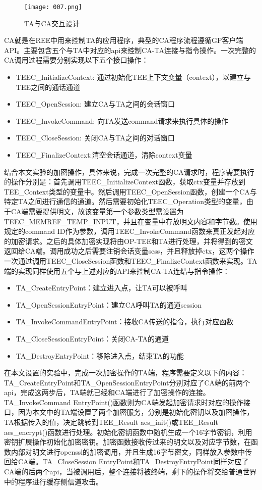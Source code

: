 \begin{figure}[H]
	\centering
	\texttt{[image: 007.png]}
	\caption{TA与CA交互设计}
	\label{007}
\end{figure}

CA就是在REE中用来控制TA的应用程序，典型的CA程序流程遵循GP客户端API。主要包含五个与TA中对应的api来控制CA-TA连接与指令操作。一次完整的CA调用过程需要分别实现以下五个接口操作：

\begin{itemize}
	\item TEEC\_InitializeContext: 通过初始化TEE上下文变量（context），以建立与TEE之间的通话通道
	\item TEEC\_OpenSession: 建立CA与TA之间的会话窗口
	\item TEEC\_InvokeCommand: 向TA发送command请求来执行具体的操作
	\item TEEC\_CloseSession: 关闭CA与TA之间的对话窗口
	\item TEEC\_FinalizeContext:清空会话通道，清除context变量
\end{itemize}

结合本文实验的加密操作，具体来说，完成一次完整的CA请求时，程序需要执行的操作分别是：首先调用TEEC\_InitializeContext函数，获取ctx变量并存放到TEE\_Context类型的变量中。然后调用TEEC\_OpenSession函数，创建一个CA与特定TA之间进行通信的通道。然后需要初始化TEEC\_Operation类型的变量，由于CA端需要提供明文，故该变量第一个参数类型需设置为TEEC\_MEMREF\_TEMP\_INPUT，并且在变量中存放明文内容和字节数。使用规定的command ID作为参数，调用TEEC\_InvokeCommand函数来真正发起对应的加密请求。之后的具体加密实现将由OP-TEE和TA进行处理，并将得到的密文返回给CA端。调用成功之后需要注销会话变量sess，并且释放掉ctx，这两个操作一次通过调用TEEC\_CloseSession函数和TEEC\_FinalizeContext函数来实现。TA端的实现同样使用五个与上述对应的API来控制CA-TA连结与指令操作：

\begin{itemize}
	\item TA\_CreateEntryPoint：建立进入点，让TA可以被呼叫
	\item TA\_OpenSessionEntryPoint：建立CA呼叫TA的通道session
	\item TA\_InvokeCommandEntryPoint：接收CA传送的指令，执行对应函数
	\item TA\_CloseSessionEntryPoint：关闭CA-TA的通道
	\item TA\_DestroyEntryPoint：移除进入点，结束TA的功能
\end{itemize}

在本文设置的实验中，完成一次加密操作的TA端，程序需要定义以下的内容：TA\_CreateEntryPoint和TA\_OpenSessionEntryPoint分别对应了CA端的前两个api，完成这两步后，TA端就已经和CA端进行了加密操作的连接。TA\_InvokeCommand EntryPoint()函数则为CA端发起加密请求时对应的操作接口，因为本文中的TA端设置了两个加密服务，分别是初始化密钥以及加密操作，TA根据传入的值，决定跳转到TEE\_Result aes\_init()或TEE\_Result aes\_encrypt()函数进行处理。初始化密钥函数中随机生成一个16字节密钥，利用密钥扩展操作初始化加密密钥。加密函数接收传过来的明文以及对应字节数，在函数内部对明文进行openssl的加密调用，并且生成16字节密文，同样放入参数中传回给CA端。TA\_CloseSession EntryPoint和TA\_DestroyEntryPoint同样对应了CA端的后两个api，当被调用后，整个连接将被终端，剩下的操作将交给普通世界中的程序进行缓存侧信道攻击。

